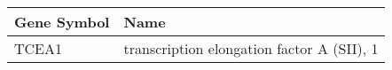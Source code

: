 \begin{tabular}{ll}
\toprule
Gene Symbol &                                       Name \\
\midrule
      TCEA1 & transcription elongation factor A (SII), 1 \\
\bottomrule
\end{tabular}
